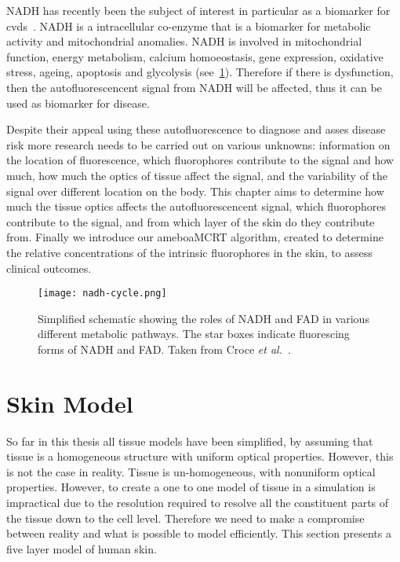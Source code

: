 NADH has recently been the subject of interest in particular as a biomarker for \gls*{cvds}~\cite{akbar2014vivo,elahi2009oxidative,blacker2016investigating}.
NADH is a intracellular co-enzyme that is a biomarker for metabolic activity and mitochondrial anomalies. 
NADH is involved in mitochondrial function, energy metabolism, calcium homoeostasis, gene expression, oxidative stress, ageing, apoptosis and glycolysis (see~\cref{fig:nadhfadpath}).
Therefore if there is dysfunction, then the autofluorescencent signal from NADH will be affected, thus it can be used as biomarker for disease.


Despite their appeal using these autofluorescence to diagnose and asses disease risk more research needs to be carried out on various unknowns: information on the location of fluorescence, which fluorophores contribute to the signal and how much, how much the optics of tissue affect the signal, and the variability of the signal over different location on the body.
This chapter aims to determine how much the tissue optics affects the autofluorescencent signal, which fluorophores contribute to the signal, and from which layer of the skin do they contribute from.
Finally we introduce our ameboaMCRT algorithm, created to determine the relative concentrations of the intrinsic fluorophores in the skin, to assess clinical outcomes.


\begin{figure}[!htpb]
  \centering
  \texttt{[image: nadh-cycle.png]}
  \caption{Simplified schematic showing the roles of NADH and FAD in various different metabolic pathways. The star boxes indicate fluorescing forms of NADH and FAD. Taken from Croce \textit{et al.}~\cite{croce2014autofluorescence}.}
  \label{fig:nadhfadpath}
\end{figure}


\FloatBarrier

\section{Skin Model}

So far in this thesis all tissue models have been simplified, by assuming that tissue is a homogeneous structure with uniform optical properties.
However, this is not the case in reality.
Tissue is un-homogeneous, with nonuniform optical properties.
However, to create a one to one model of tissue in a simulation is impractical due to the resolution required to resolve all the constituent parts of the tissue down to the cell level.
Therefore we need to make a compromise between reality and what is possible to model efficiently.
This section presents a five layer model of human skin. 


